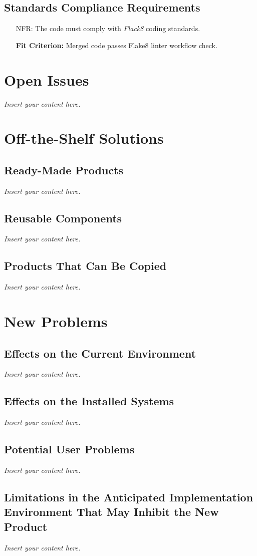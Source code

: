 \documentclass[12pt]{article}
\newcommand{\lips}{\textit{Insert your content here.}}
\newcounter{nfrnum} %
\newcommand{\rthenfrnum}{NFR\refstepcounter{nfrnum}\thenfrnum:}
\begin{document}
\subsection{Standards Compliance Requirements}
\begin{itemize}
\item[\rthenfrnum]
The code must comply with \textit{Flack8} coding standards.

\textbf{Fit Criterion:} Merged code passes Flake8 linter workflow check.
\end{itemize}
\section{Open Issues}
\lips

\section{Off-the-Shelf Solutions}
\subsection{Ready-Made Products}
\lips
\subsection{Reusable Components}
\lips
\subsection{Products That Can Be Copied}
\lips

\section{New Problems}
\subsection{Effects on the Current Environment}
\lips
\subsection{Effects on the Installed Systems}
\lips
\subsection{Potential User Problems}
\lips
\subsection{Limitations in the Anticipated Implementation Environment That May
Inhibit the New Product}
\lips
\end{document}
